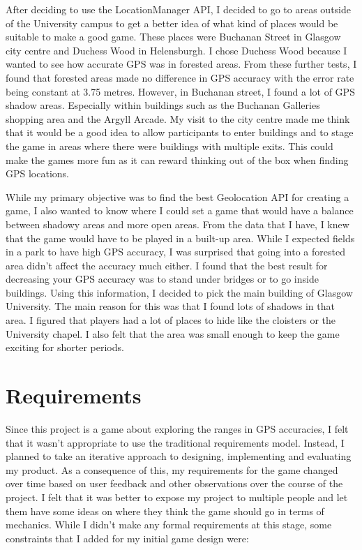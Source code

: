 \documentclass{l4proj}
\begin{document}
After deciding to use the LocationManager API, I decided to go to areas outside of the University
campus to get a better idea of what kind of places would be suitable to make a good game. These places were
Buchanan Street in Glasgow city centre and Duchess Wood in Helensburgh. I chose Duchess Wood because I wanted
to see how accurate GPS was in forested areas. From these further tests, I found that forested areas made no
difference in GPS accuracy with the error rate being constant at 3.75 metres. However, in Buchanan street, I
found a lot of GPS shadow areas. Especially within buildings such as the Buchanan Galleries shopping area
and the Argyll Arcade. My visit to the city centre made me think that it would be a good idea to allow
participants to enter buildings and to stage the game in areas where there were buildings with multiple
exits. This could make the games more fun as it can reward thinking out of the box when finding GPS locations.   

While my primary objective was to find the best Geolocation API for creating a game, I also wanted to 
know where I could set a game that would have a balance between shadowy areas and more open areas. From
the data that I have, I knew that the game would have to be played in a built-up area. While I expected
fields in a park to have high GPS accuracy, I was surprised that going into a forested area didn't affect
the accuracy much either. I found that the best result for decreasing your GPS accuracy was to stand
under bridges or to go inside buildings. Using this information, I decided to pick the main building
of Glasgow University. The main reason for this was that I found lots of shadows in that area. I figured
that players had a lot of places to hide like the cloisters or the University chapel. I also felt that
the area was small enough to keep the game exciting for shorter periods.

\section{Requirements}
Since this project is a game about exploring the ranges in GPS accuracies, I felt
that it wasn't appropriate to use the traditional requirements model. Instead, I planned to take an
iterative approach to designing, implementing and evaluating my product. As a consequence of this,
my requirements for the game changed over time based on user feedback and other observations over
the course of the project. I felt that it was better to expose my project to multiple people and
let them have some ideas on where they think the game should go in terms of mechanics. While I didn't
make any formal requirements at this stage, some constraints that I added for my initial game design were:
\end{document}
